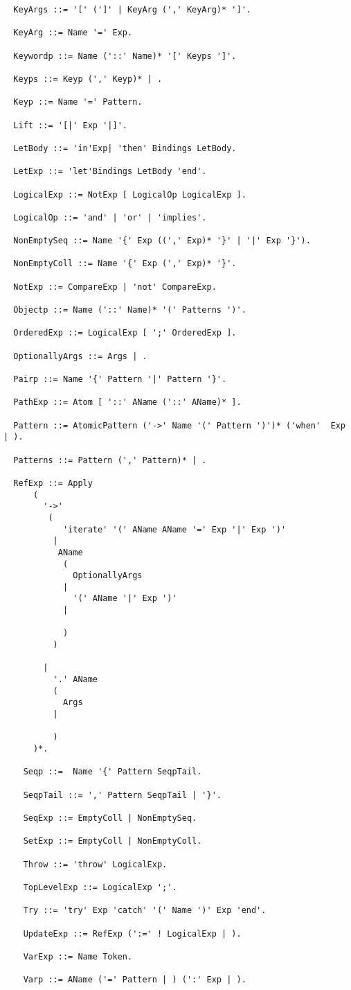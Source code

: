 \documentclass{article}
\begin{document}
\begin{verbatim}
  KeyArgs ::= '[' (']' | KeyArg (',' KeyArg)* ']'.
    
  KeyArg ::= Name '=' Exp.
    
  Keywordp ::= Name ('::' Name)* '[' Keyps ']'.
    
  Keyps ::= Keyp (',' Keyp)* | .
    
  Keyp ::= Name '=' Pattern.
    
  Lift ::= '[|' Exp '|]'.

  LetBody ::= 'in'Exp| 'then' Bindings LetBody.

  LetExp ::= 'let'Bindings LetBody 'end'.
    
  LogicalExp ::= NotExp [ LogicalOp LogicalExp ].

  LogicalOp ::= 'and' | 'or' | 'implies'.

  NonEmptySeq ::= Name '{' Exp ((',' Exp)* '}' | '|' Exp '}').
    
  NonEmptyColl ::= Name '{' Exp (',' Exp)* '}'.

  NotExp ::= CompareExp | 'not' CompareExp.

  Objectp ::= Name ('::' Name)* '(' Patterns ')'.

  OrderedExp ::= LogicalExp [ ';' OrderedExp ].

  OptionallyArgs ::= Args | .

  Pairp ::= Name '{' Pattern '|' Pattern '}'.
    
  PathExp ::= Atom [ '::' AName ('::' AName)* ].

  Pattern ::= AtomicPattern ('->' Name '(' Pattern ')')* ('when'  Exp  | ).

  Patterns ::= Pattern (',' Pattern)* | .
    
  RefExp ::= Apply 
      (
        '->' 
         (
            'iterate' '(' AName AName '=' Exp '|' Exp ')' 
          | 
           AName 
            ( 
              OptionallyArgs 
            | 
              '(' AName '|' Exp ')'  
            |
            
            ) 
          ) 
     
        | 
          '.' AName 
          (
            Args
          |   
          
          )   
      )*. 
  
    Seqp ::=  Name '{' Pattern SeqpTail.

    SeqpTail ::= ',' Pattern SeqpTail | '}'.
    
    SeqExp ::= EmptyColl | NonEmptySeq.

    SetExp ::= EmptyColl | NonEmptyColl. 

    Throw ::= 'throw' LogicalExp.

    TopLevelExp ::= LogicalExp ';'.

    Try ::= 'try' Exp 'catch' '(' Name ')' Exp 'end'.

    UpdateExp ::= RefExp (':=' ! LogicalExp | ).

    VarExp ::= Name Token.

    Varp ::= AName ('=' Pattern | ) (':' Exp | ).

\end{verbatim}
\end{document}
